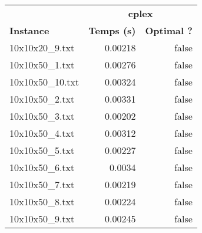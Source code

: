 \documentclass{article}
\begin{document}
\newpage
\begin{center}
\renewcommand{\arraystretch}{1.4} 
 \begin{tabular}{lrr}
	\hline
 & \multicolumn{2}{c}{\textbf{cplex}}\\
\textbf{Instance}  & \textbf{Temps (s)} & \textbf{Optimal ?} \\\hline

10x10x20\_9.txt & 0.00218 & false
\\
10x10x50\_1.txt & 0.00276 & false
\\
10x10x50\_10.txt & 0.00324 & false
\\
10x10x50\_2.txt & 0.00331 & false
\\
10x10x50\_3.txt & 0.00202 & false
\\
10x10x50\_4.txt & 0.00312 & false
\\
10x10x50\_5.txt & 0.00227 & false
\\
10x10x50\_6.txt & 0.0034 & false
\\
10x10x50\_7.txt & 0.00219 & false
\\
10x10x50\_8.txt & 0.00224 & false
\\
10x10x50\_9.txt & 0.00245 & false
\\
\hline\end{tabular}
\end{center}
\end{document}
